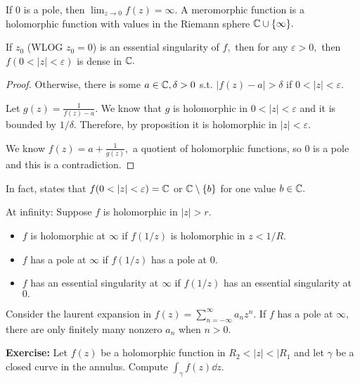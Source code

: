 \documentclass[a4paper,12pt]{article}
\begin{document}
If $0$ is a pole, then $\lim_{z\to 0}f(z)=\infty.$ A meromorphic function is a holomorphic function with values in the Riemann sphere $\mathbb{C}\cup\{\infty\}.$
\begin{theorem}[Weierstrass]
    If $z_0$ (WLOG $z_0=0$) is an essential singularity of $f,$ then for any $\varepsilon>0,$ then $f(0<|z|<\varepsilon)$ is dense in $\mathbb{C}.$
    \begin{proof}
        Otherwise, there is some $a\in\mathbb{C},\delta>0$ s.t. $|f(z)-a|>\delta$ if $0<|z|<\varepsilon.$

        Let $g(z)=\frac{1}{f(z)-a}.$ We know that $g$ is holomorphic in $0<|z|<\varepsilon$ and it is bounded by $1/\delta.$ Therefore, by proposition it is holomorphic in $|z|<\varepsilon.$

        We know $f(z)=a+\frac{1}{g(z)},$ a quotient of holomorphic functions, so $0$ is a pole and this is a contradiction.
    \end{proof}
    In fact,  states that $f(0<|z|<\varepsilon)=\C$ or $\mathbb{C}\setminus\{b\}$ for one value $b\in\mathbb{C}.$
\end{theorem}

At infinity: Suppose $f$ is holomorphic in $|z|>r.$ \begin{itemize}
    \item $f$ is holomorphic at $\infty$ if $f(1/z)$ is holomorphic in $z<1/R.$
    \item $f$ has a pole at $\infty$ if $f(1/z)$ has a pole at $0.$
    \item $f$ has an essential singularity at $\infty$ if $f(1/z)$ has an essential singularity at $0.$ 
\end{itemize}
Consider the laurent expansion in $f(z)=\sum_{n=-\infty}^\infty a_nz^n.$ If $f$ has a pole at $\infty,$ there are only finitely many nonzero $a_n$ when $n>0.$

\textbf{Exercise:} Let $f(z)$ be a holomorphic function in $R_2<|z|<|R_1$ and let $\gamma$ be a closed curve in the annulus. Compute $\int_\gamma f(z)\dd z.$
\end{document}
